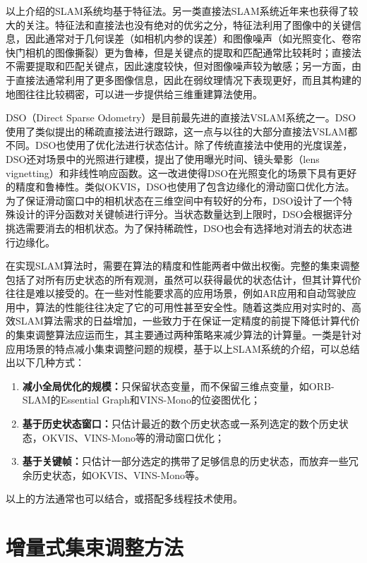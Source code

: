 以上介绍的SLAM系统均基于特征法。另一类直接法SLAM系统近年来也获得了较大的关注。特征法和直接法也没有绝对的优劣之分，特征法利用了图像中的关键信息，因此通常对于几何误差（如相机内参的误差）和图像噪声（如光照变化、卷帘快门相机的图像撕裂）更为鲁棒，但是关键点的提取和匹配通常比较耗时；直接法不需要提取和匹配关键点，因此速度较快，但对图像噪声较为敏感；另一方面，由于直接法通常利用了更多图像信息，因此在弱纹理情况下表现更好，而且其构建的地图往往比较稠密，可以进一步提供给三维重建算法使用。

DSO（Direct Sparse Odometry）\citep{engel2018direct}是目前最先进的直接法VSLAM系统之一。DSO使用了类似\citep{jin2003semi,forster2014svo}提出的稀疏直接法进行跟踪，这一点与以往的大部分直接法VSLAM都不同。DSO也使用了优化法进行状态估计。除了传统直接法中使用的光度误差，DSO还对场景中的光照进行建模，提出了使用曝光时间、镜头晕影（lens vignetting）和非线性响应函数。这一改进使得DSO在光照变化的场景下具有更好的精度和鲁棒性。类似OKVIS，DSO也使用了包含边缘化的滑动窗口优化方法。为了保证滑动窗口中的相机状态在三维空间中有较好的分布，DSO设计了一个特殊设计的评分函数对关键帧进行评分。当状态数量达到上限时，DSO会根据评分挑选需要消去的相机状态。为了保持稀疏性，DSO也会有选择地对消去的状态进行边缘化。

在实现SLAM算法时，需要在算法的精度和性能两者中做出权衡。完整的集束调整包括了对所有历史状态的所有观测，虽然可以获得最优的状态估计，但其计算代价往往是难以接受的。在一些对性能要求高的应用场景，例如AR应用和自动驾驶应用中，算法的性能往往决定了它的可用性甚至安全性。随着这类应用对实时的、高效SLAM算法需求的日益增加，一些致力于在保证一定精度的前提下降低计算代价的集束调整算法应运而生，其主要通过两种策略来减少算法的计算量。一类是针对应用场景的特点减小集束调整问题的规模，基于以上SLAM系统的介绍，可以总结出以下几种方式：
\begin{enumerate}
    \item \textbf{减小全局优化的规模：}只保留状态变量，而不保留三维点变量，如ORB-SLAM的Essential Graph和VINS-Mono的位姿图优化；
    \item \textbf{基于历史状态窗口：}只估计最近的数个历史状态或一系列选定的数个历史状态，OKVIS、VINS-Mono等的滑动窗口优化；
    \item \textbf{基于关键帧：}只估计一部分选定的携带了足够信息的历史状态，而放弃一些冗余历史状态，如OKVIS、VINS-Mono等。
\end{enumerate}
以上的方法通常也可以结合，或搭配多线程技术使用。

\section{增量式集束调整方法}

